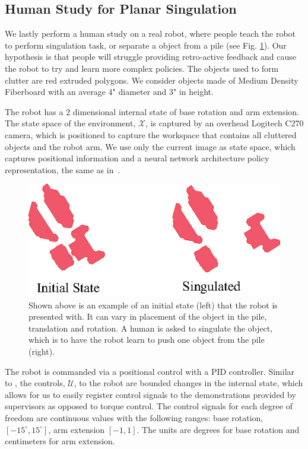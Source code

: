\documentclass[10pt, conference]{ieeeconf}      %
\begin{document}
\subsection{Human Study for Planar Singulation}
We lastly perform a human study on a real robot, where people teach the robot to perform singulation task, or separate a object from a pile (see Fig. \ref{fig:izzy_sing}). Our hypothesis is that people will struggle providing retro-active feedback and cause the robot to try and learn more complex policies.  The objects used to form clutter are red extruded polygons. We consider objects made of Medium Density Fiberboard with an average 4" diameter and 3" in height. 

The robot has a 2 dimensional internal state of base rotation and arm extension. The state space of the environment, $\mathcal{X}$, is captured by  an overhead Logitech C270 camera, which is positioned to capture the workspace that contains all cluttered objects and the robot arm. We use only the current image as state space, which captures positional information and a neural network architecture policy representation, the same as in~\cite{laskeyrobot}.

\begin{figure}
\centering
\includegraphics{f_figs/singulation.eps}
\caption{
    \footnotesize
Shown above is an example of an initial state (left) that the robot is presented with. It can vary in placement of the object in the pile, translation and rotation. A human is asked to singulate the object, which is to have the robot learn to push one object from the pile (right).  }

\label{fig:izzy_sing}
\end{figure}

The robot is commanded via a positional control with a  PID controller. Similar to \cite{laskeyshiv}, the controls, $\mathcal{U}$, to the robot are bounded changes in the internal state, which allows for us to easily register control signals to the demonstrations provided by supervisors as opposed to torque control. The control signals for each degree of freedom are continuous values with the following ranges: base rotation, $[-15^\circ,15^\circ]$, arm extension $[-1,1]$. The units are degrees for base rotation and centimeters for arm extension. 
\end{document}
